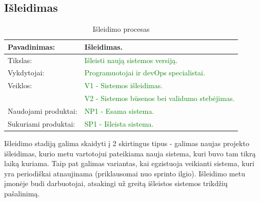 \documentclass{VUMIFPSkursinis}
\begin{document}
	\subsection{Išleidimas}
	\begin{center}
		\begin{table}[ht]
			\caption{Išleidimo procesas}
			\begin{tabular}{ | l | l | }
				\hline
				Pavadinimas:		& Išleidimas.						\\ \hline
				Tikslas:		& \textcolor{green}{Išleisti naują sistemos versiją.}			\\ \hline
				Vykdytojai:		& \textcolor{green}{Programuotojai ir devOps specialistai.}		\\ \hline
				Veiklos:		&\textcolor{green}{ V1 - Sistemos išleidimas. }				\\
							& \textcolor{green}{V2 - Sistemos būsenos bei validumo stebėjimas.}	\\ \hline

				Naudojami produktai:	& \textcolor{green}{NP1 - Esama sistema.}					\\ \hline
				Sukuriami produktai:	&\textcolor{green}{ SP1 - Išleista sistema. }				\\ \hline
			\end{tabular}
		\end{table}
	\end{center}
	Išleidimo stadiją galima skaidyti į 2 skirtingus tipus - galimas naujas projekto išleidimas, kurio metu vartotojui pateikiama nauja sistema, kuri buvo tam tikrą laiką kuriama.
	Taip pat galimas variantas, kai egzistuoja veikianti sistema, kuri yra periodiškai atnaujinama (priklausomai nuo sprinto ilgio).
	Išleidimo metu įmonėje budi darbuotojai, atsakingi už greitą išleistos sistemos trikdžių pašalinimą.
	\newpage
\end{document}
